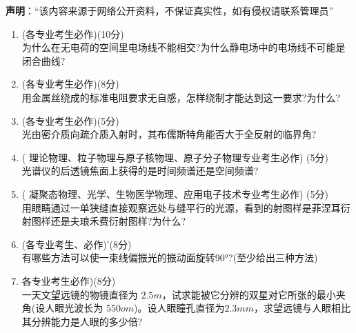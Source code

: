 
\textbf{声明}：“该内容来源于网络公开资料，不保证真实性，如有侵权请联系管理员”

\begin{enumerate}
\item (各专业考生必作)(10分)\\
为什么在无电荷的空间里电场线不能相交?为什么静电场中的电场线不可能是闭合曲线?
\item (各专业考生必作)(8分)\\
用金属丝绕成的标准电阻要求无自感，怎样绕制才能达到这一要求?为什么?
\item (各专业考生必作)(5分)\\
光由密介质向疏介质入射时，其布儒斯特角能否大于全反射的临界角?
\item ( 理论物理、粒子物理与原子核物理、原子分子物理专业考生必作)
(5分)\\
光谱仪的后透镜焦面上获得的是时间频谱还是空间频谱?
\item ( 凝聚态物理、光学、生物医学物理、应用电子技术专业考生必作)
(5分)\\
用眼睛通过一单狭缝直接观察远处与缝平行的光源，看到的射图样是菲涅耳衍射图样还是夫琅禾费衍射图样?为什么?
\item (各专业考生、必作)'(8分)\\
有哪些方法可以使一束线偏振光的振动面旋转90°?(至少给出三种方法)
\item 各专业考生必作)(8分)\\
一天文望远镜的物镜直径为 $2.5m$，试求能被它分辨的双星对它所张的最小夹角(设人眼光波长为 $550om$)。设人眼瞳孔直径为$2.3mm$，求望远镜与人眼相比其分辨能力是人眼的多少倍?
\end{enumerate}
